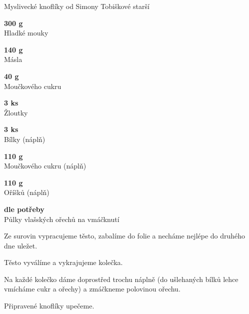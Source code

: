 \documentclass[11pt,a4paper]{article}
\begin{document}
\begin{recipe}[Teal]{Myslivecké knoflíky od Simony Tobiškové starší}
    \begin{ingredients}
        \item \parbox[t]{\linewidth}{\raggedright \weight \textbf{300 g}\\ Hladké mouky}
        \item \parbox[t]{\linewidth}{\raggedright \weight \textbf{140 g}\\ Másla}
        \item \parbox[t]{\linewidth}{\raggedright \weight \textbf{40 g}\\ Moučkového cukru}
        \item \parbox[t]{\linewidth}{\raggedright \piece \textbf{3 ks}\\ Žloutky}
        \item \parbox[t]{\linewidth}{\raggedright \piece \textbf{3 ks}\\ Bílky (náplň)}
        \item \parbox[t]{\linewidth}{\raggedright \weight \textbf{110 g}\\ Moučkového cukru (náplň)}
        \item \parbox[t]{\linewidth}{\raggedright \weight \textbf{110 g}\\ Oříšků (náplň)}
        \item \parbox[t]{\linewidth}{\raggedright \indefinite \textbf{dle potřeby}\\ Půlky vlašských ořechů na vmáčknutí}
    \end{ingredients}
    \begin{steps}
        \item Ze surovin vypracujeme těsto, zabalíme do folie a necháme nejlépe do druhého dne uležet.
        \item Těsto vyválíme a vykrajujeme kolečka.
        \item Na každé kolečko dáme doprostřed trochu náplně (do ušlehaných bílků lehce vmícháme cukr a ořechy) a zmáčkneme polovinou ořechu.
        \item Připravené knoflíky upečeme.
    \end{steps}
\end{recipe}
\end{document}
